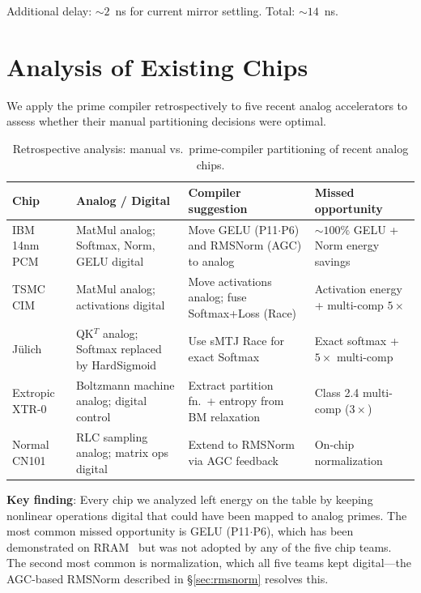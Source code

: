 \documentclass[11pt]{article}
\begin{document}
Additional delay: ${\sim}2$~ns for current mirror settling. Total: ${\sim}14$~ns.

\section{Analysis of Existing Chips}
\label{sec:analysis}

We apply the prime compiler retrospectively to five recent analog accelerators to assess whether their manual partitioning decisions were optimal.

\begin{table}[t]
\centering
\caption{Retrospective analysis: manual vs.\ prime-compiler partitioning of recent analog chips.}
\label{tab:chips}
\footnotesize
\begin{tabular}{p{2.8cm}p{2.5cm}p{2.5cm}p{4.5cm}}
\toprule
Chip & Analog / Digital & Compiler suggestion & Missed opportunity \\
\midrule
IBM 14nm PCM~\cite{ibm2025} & MatMul analog; Softmax, Norm, GELU digital & Move GELU (P11$\cdot$P6) and RMSNorm (AGC) to analog & ${\sim}100\%$ GELU + Norm energy savings \\
\midrule
TSMC CIM~\cite{tsmc2025} & MatMul analog; activations digital & Move activations analog; fuse Softmax+Loss (Race) & Activation energy + multi-comp $5\times$ \\
\midrule
J\"ulich~\cite{leroux2025a} & QK$^T$ analog; Softmax replaced by HardSigmoid & Use sMTJ Race for exact Softmax & Exact softmax + $5\times$ multi-comp \\
\midrule
Extropic XTR-0~\cite{extropic2025} & Boltzmann machine analog; digital control & Extract partition fn.\ + entropy from BM relaxation & Class 2.4 multi-comp ($3\times$) \\
\midrule
Normal CN101~\cite{normal2025} & RLC sampling analog; matrix ops digital & Extend to RMSNorm via AGC feedback & On-chip normalization \\
\bottomrule
\end{tabular}
\end{table}

\textbf{Key finding}: Every chip we analyzed left energy on the table by keeping nonlinear operations digital that could have been mapped to analog primes. The most common missed opportunity is GELU (P11$\cdot$P6), which has been demonstrated on RRAM~\cite{rram_swish2022,raceit2023} but was not adopted by any of the five chip teams. The second most common is normalization, which all five teams kept digital---the AGC-based RMSNorm described in \S\ref{sec:rmsnorm} resolves this.
\end{document}
